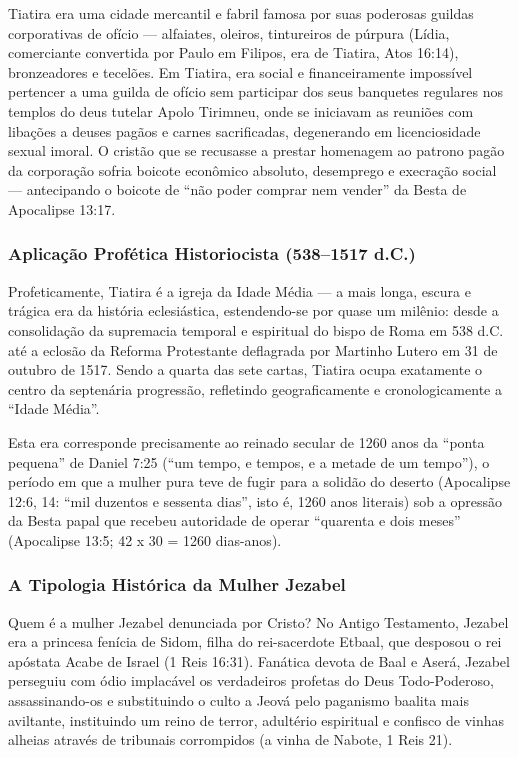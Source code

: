 \documentclass[11pt,a4paper,openany]{book}
\begin{document}
Tiatira era uma cidade mercantil e fabril famosa por suas poderosas guildas corporativas de ofício — alfaiates, oleiros, tintureiros de púrpura (Lídia, comerciante convertida por Paulo em Filipos, era de Tiatira, Atos 16:14), bronzeadores e tecelões. Em Tiatira, era social e financeiramente impossível pertencer a uma guilda de ofício sem participar dos seus banquetes regulares nos templos do deus tutelar Apolo Tirimneu, onde se iniciavam as reuniões com libações a deuses pagãos e carnes sacrificadas, degenerando em licenciosidade sexual imoral. O cristão que se recusasse a prestar homenagem ao patrono pagão da corporação sofria boicote econômico absoluto, desemprego e execração social — antecipando o boicote de ``não poder comprar nem vender'' da Besta de Apocalipse 13:17.


\subsubsection*{Aplicação Profética Historiocista (538–1517 d.C.)}
Profeticamente, Tiatira é a igreja da Idade Média — a mais longa, escura e trágica era da história eclesiástica, estendendo-se por quase um milênio: desde a consolidação da supremacia temporal e espiritual do bispo de Roma em 538 d.C. até a eclosão da Reforma Protestante deflagrada por Martinho Lutero em 31 de outubro de 1517. Sendo a quarta das sete cartas, Tiatira ocupa exatamente o centro da septenária progressão, refletindo geograficamente e cronologicamente a ``Idade Média''.

Esta era corresponde precisamente ao reinado secular de 1260 anos da ``ponta pequena'' de Daniel 7:25 (``um tempo, e tempos, e a metade de um tempo''), o período em que a mulher pura teve de fugir para a solidão do deserto (Apocalipse 12:6, 14: ``mil duzentos e sessenta dias'', isto é, 1260 anos literais) sob a opressão da Besta papal que recebeu autoridade de operar ``quarenta e dois meses'' (Apocalipse 13:5; 42 x 30 = 1260 dias-anos).


\subsubsection*{A Tipologia Histórica da Mulher Jezabel}
Quem é a mulher Jezabel denunciada por Cristo? No Antigo Testamento, Jezabel era a princesa fenícia de Sidom, filha do rei-sacerdote Etbaal, que desposou o rei apóstata Acabe de Israel (1 Reis 16:31). Fanática devota de Baal e Aserá, Jezabel perseguiu com ódio implacável os verdadeiros profetas do Deus Todo-Poderoso, assassinando-os e substituindo o culto a Jeová pelo paganismo baalita mais aviltante, instituindo um reino de terror, adultério espiritual e confisco de vinhas alheias através de tribunais corrompidos (a vinha de Nabote, 1 Reis 21).
\end{document}
